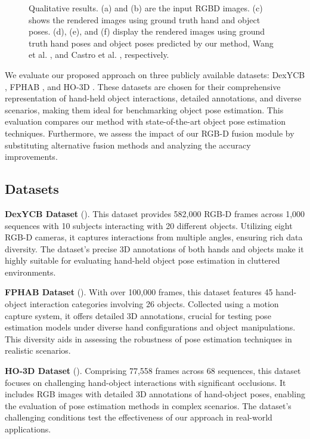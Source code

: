 \begin{figure}[h!]
  \caption{Qualitative results. (a) and (b) are the input RGBD images. (c) shows the rendered images using ground truth hand and object poses. (d), (e), and (f) display the rendered images using ground truth hand poses and object poses predicted by our method, Wang et al. \cite{wang2019densefusion}, and Castro et al. \cite{castro2023crt}, respectively.}
  \label{fig:result}
\end{figure}

We evaluate our proposed approach on three publicly available datasets: DexYCB \cite{chao2021dexycb}, FPHAB \cite{garcia2018first}, and HO-3D \cite{hampali2020honnotate}. These datasets are chosen for their comprehensive representation of hand-held object interactions, detailed annotations, and diverse scenarios, making them ideal for benchmarking object pose estimation. This evaluation compares our method with state-of-the-art object pose estimation techniques. Furthermore, we assess the impact of our RGB-D fusion module by substituting alternative fusion methods and analyzing the accuracy improvements.

\subsection{Datasets}

\textbf{DexYCB Dataset} (\cite{chao2021dexycb}). This dataset provides 582,000 RGB-D frames across 1,000 sequences with 10 subjects interacting with 20 different objects. Utilizing eight RGB-D cameras, it captures interactions from multiple angles, ensuring rich data diversity. The dataset's precise 3D annotations of both hands and objects make it highly suitable for evaluating hand-held object pose estimation in cluttered environments.

\textbf{FPHAB Dataset} (\cite{garcia2018first}). With over 100,000 frames, this dataset features 45 hand-object interaction categories involving 26 objects. Collected using a motion capture system, it offers detailed 3D annotations, crucial for testing pose estimation models under diverse hand configurations and object manipulations. This diversity aids in assessing the robustness of pose estimation techniques in realistic scenarios.

\textbf{HO-3D Dataset} (\cite{hampali2020honnotate}). Comprising 77,558 frames across 68 sequences, this dataset focuses on challenging hand-object interactions with significant occlusions. It includes RGB images with detailed 3D annotations of hand-object poses, enabling the evaluation of pose estimation methods in complex scenarios. The dataset's challenging conditions test the effectiveness of our approach in real-world applications.

